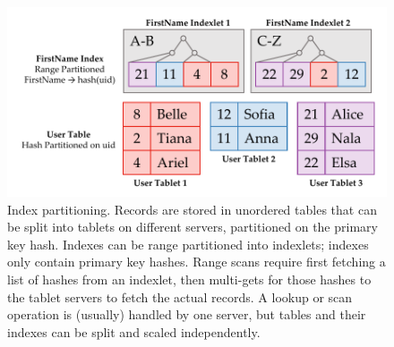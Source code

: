 \begin{figure}[t]
\centering
\includegraphics[width=1.0\columnwidth]{figures/ramcloud-index.pdf}
\caption{Index partitioning. Records are stored in unordered tables that can be
  split into tablets on different servers, partitioned on the primary key hash.
  Indexes can be range partitioned into indexlets; indexes only contain primary
  key hashes. Range scans require first fetching a list of hashes from an
  indexlet, then multi-gets for those hashes to the tablet servers to fetch the
  actual records.  A lookup or scan operation is (usually) handled by one
  server, but tables and their indexes can be split and scaled independently.}
\label{fig:index}
\end{figure}
